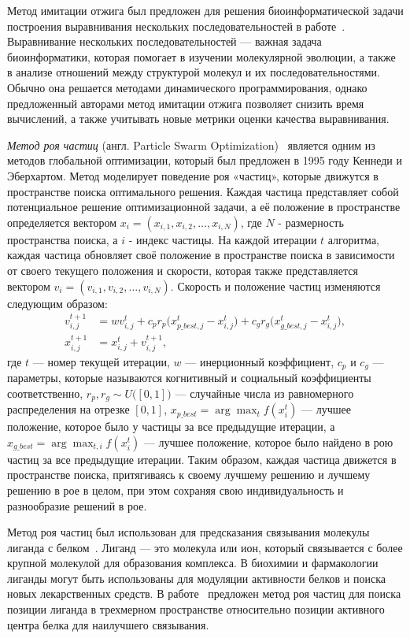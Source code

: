 Метод имитации отжига был предложен для решения биоинформатической задачи построения выравнивания нескольких последовательностей в работе~\cite{kim1994multiple}.
Выравнивание нескольких последовательностей --- важная задача биоинформатики, которая помогает в изучении молекулярной эволюции, а также в анализе отношений между структурой молекул и их последовательностями.
Обычно она решается методами динамического программирования, однако предложенный авторами метод имитации отжига позволяет снизить время вычислений, а также учитывать новые метрики оценки качества выравнивания.

\emph{Метод роя частиц} (англ. Particle Swarm Optimization)~\cite{kennedy1995particle,shi1998modified} является одним из методов глобальной оптимизации, который был предложен в 1995 году Кеннеди и Эберхартом. 
Метод моделирует поведение роя «частиц», которые движутся в пространстве поиска оптимального решения.
Каждая частица представляет собой потенциальное решение оптимизационной задачи, а её положение в пространстве определяется вектором $x_i = (x_{i,1}, x_{i,2}, \dots, x_{i,N})$, где $N$ - размерность пространства поиска, а $i$ - индекс частицы.
На каждой итерации $t$ алгоритма, каждая частица обновляет своё положение в пространстве поиска в зависимости от своего текущего положения и скорости, которая также представляется вектором $v_i = (v_{i,1}, v_{i,2}, \dots, v_{i,N})$.
Скорость и положение частиц изменяются следующим образом:
\begin{align*}
v_{i,j}^{t+1} &= wv_{i,j}^t + c_p r_p\big(x_{p\_best,j}^t - x_{i,j}^t\big) + c_g r_g\big(x_{g\_best,j}^t - x_{i,j}^t\big), \\
x_{i,j}^{t+1} &= x_{i,j}^t + v_{i,j}^{t+1},
\end{align*}
где $t$ --- номер текущей итерации, $w$ --- инерционный коэффициент, $c_p$ и $c_g$ --- параметры, которые называются когнитивный и социальный коэффициенты соответственно, $r_p, r_g \sim U\big([0,1]\big)$ --- случайные числа из равномерного распределения на отрезке $[0,1]$, $x_{p\_best} = \arg\max_t f(x_i^t) $ --- лучшее положение, которое было у частицы за все предыдущие итерации, а $x_{g\_best} = \arg\max_{t, i} f(x_i^t)$ --- лучшее положение, которое было найдено в рою частиц за все предыдущие итерации.
Таким образом, каждая частица движется в пространстве поиска, притягиваясь к своему лучшему решению и лучшему решению в рое в целом, при этом сохраняя свою индивидуальность и разнообразие решений в рое.

Метод роя частиц был использован для предсказания связывания молекулы лиганда с белком~\cite{ng2015psovina}.
Лиганд --- это молекула или ион, который связывается с более крупной молекулой для образования комплекса.
В биохимии и фармакологии лиганды могут быть использованы для модуляции активности белков и поиска новых лекарственных средств.
В работе~\cite{ng2015psovina} предложен метод роя частиц для поиска позиции лиганда в трехмерном пространстве относительно позиции активного центра белка для наилучшего связывания.

